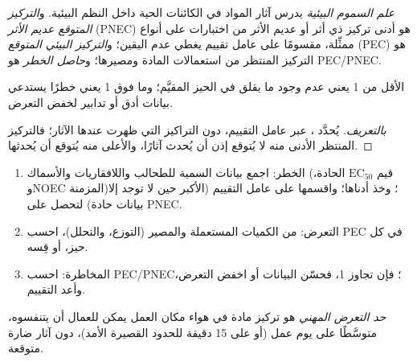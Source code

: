 \begin{definition}\label{def:b3:environmental-toxicology:ecotoxicology}
\emph{علم السموم البيئية} يدرس آثار المواد في
الكائنات الحية داخل النظم البيئية. و\emph{التركيز المتوقع
عديم الأثر} (PNEC) هو أدنى
تركيز ذي أثر أو عديم الأثر من اختبارات على أنواع ممثِّلة،
مقسومًا على عامل تقييم يغطي عدم اليقين؛ 
و\emph{التركيز البيئي المتوقع}
(PEC) هو التركيز المنتظر من استعمالات المادة ومصيرها؛
و\emph{حاصل الخطر} هو PEC/PNEC.
\end{definition}

\begin{proposition}\label{prop:b3:environmental-toxicology:risk-quotient}
 الأقل من 1 يعني عدم وجود ما يقلق في الحيز المقيَّم؛ وما فوق
1 يعني خطرًا يستدعي بيانات أدق أو تدابير لخفض التعرض.
\end{proposition}

\begin{proof}[بالتعريف]
يُحدَّد ، عبر عامل التقييم، دون التراكيز التي
ظهرت عندها الآثار؛ فالتركيز المنتظر الأدنى منه لا يُتوقع إذن
أن يُحدث آثارًا، والأعلى منه يُتوقع أن يُحدثها.
\end{proof}

\begin{method}\label{met:b3:environmental-toxicology:risk}
\begin{enumerate}
  \item الخطر: اجمع بيانات السمية للطحالب واللافقاريات والأسماك (قيم
        $\mathrm{EC_{50}}$ الحادة، وNOEC المزمنة)؛ وخذ أدناها؛ واقسمها على عامل التقييم (الأكبر حين
        لا توجد إلا بيانات حادة) لتحصل على PNEC.
  \item التعرض: من الكميات المستعملة والمصير (التوزع، والتحلل)،
        احسب PEC في كل حيز، أو قِسه.
  \item المخاطرة: احسب PEC/PNEC؛ فإن تجاوز 1، فحسّن البيانات أو اخفض
        التعرض، وأعد التقييم.
\end{enumerate}
\end{method}

\begin{definition}\label{def:b3:environmental-toxicology:oel}
\emph{حد التعرض المهني} هو
تركيز مادة في هواء مكان العمل يمكن للعمال أن يتنفسوه،
متوسَّطًا على يوم عمل (أو على 15 دقيقة للحدود القصيرة الأمد)، دون
آثار ضارة متوقعة.
\end{definition}

